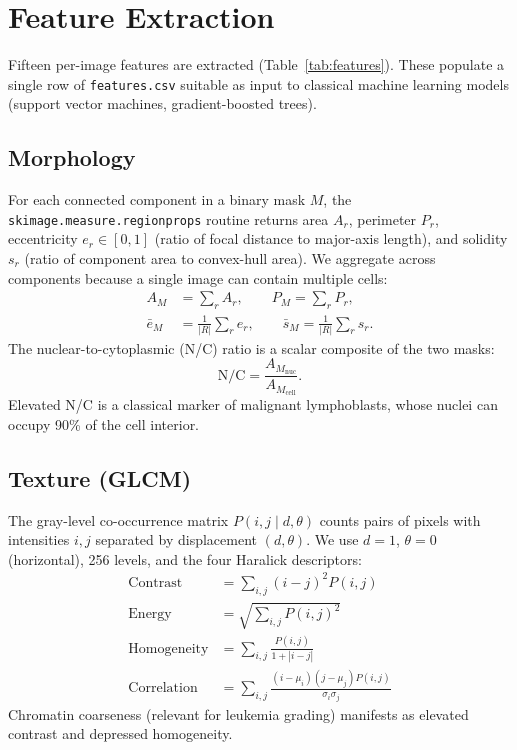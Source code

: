 \documentclass[conference,10pt]{IEEEtran}
\begin{document}
\section{Feature Extraction}
\label{sec:features}

Fifteen per-image features are extracted (Table~\ref{tab:features}). These populate a single row of \texttt{features.csv} suitable as input to classical machine learning models (support vector machines, gradient-boosted trees).

\subsection{Morphology}
For each connected component in a binary mask $M$, the \texttt{skimage.measure.regionprops} routine returns area $A_r$, perimeter $P_r$, eccentricity $e_r \in [0,1]$ (ratio of focal distance to major-axis length), and solidity $s_r$ (ratio of component area to convex-hull area). We aggregate across components because a single image can contain multiple cells:
\begin{align}
  A_M &= \sum_r A_r, \qquad P_M = \sum_r P_r, \\
  \bar{e}_M &= \frac{1}{|R|}\sum_r e_r, \qquad
  \bar{s}_M = \frac{1}{|R|}\sum_r s_r.
\end{align}
The nuclear-to-cytoplasmic (N/C) ratio is a scalar composite of the two masks:
\begin{equation}
  \mathrm{N/C} = \frac{A_{M_{\mathrm{nuc}}}}{A_{M_{\mathrm{cell}}}}.
  \label{eq:ncratio}
\end{equation}
Elevated N/C is a classical marker of malignant lymphoblasts, whose nuclei can occupy 90\% of the cell interior.

\subsection{Texture (GLCM)}
The gray-level co-occurrence matrix $P(i, j \mid d, \theta)$ counts pairs of pixels with intensities $i, j$ separated by displacement $(d, \theta)$. We use $d = 1$, $\theta = 0$ (horizontal), 256 levels, and the four Haralick descriptors:
\begin{align}
  \mathrm{Contrast}    &= \sum_{i,j} (i - j)^2 P(i, j) \\
  \mathrm{Energy}      &= \sqrt{\sum_{i,j} P(i, j)^2} \\
  \mathrm{Homogeneity} &= \sum_{i,j} \frac{P(i, j)}{1 + |i - j|} \\
  \mathrm{Correlation} &= \sum_{i,j} \frac{(i - \mu_i)(j - \mu_j) P(i, j)}{\sigma_i \sigma_j}
\end{align}
Chromatin coarseness (relevant for leukemia grading) manifests as elevated contrast and depressed homogeneity.
\end{document}
